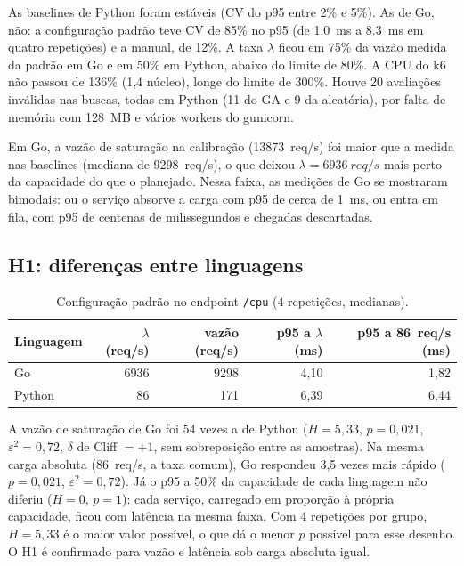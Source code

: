 \documentclass[11pt,a4paper]{article}
\begin{document}
As baselines de Python foram estáveis (CV do p95 entre 2\% e 5\%). As de Go, não: a configuração padrão teve CV de
85\% no p95 (de \SI{1,0}{ms} a \SI{8,3}{ms} em quatro repetições) e a manual, de 12\%. A taxa $\lambda$ ficou em 75\% da
vazão medida da padrão em Go e em 50\% em Python, abaixo do limite de 80\%. A CPU do k6 não passou de 136\% (1,4 núcleo),
longe do limite de 300\%. Houve 20 avaliações inválidas nas buscas, todas em Python (11 do GA e 9 da aleatória), por falta
de memória com \SI{128}{MB} e vários workers do gunicorn.

Em Go, a vazão de saturação na calibração (\SI{13873}{req/s}) foi maior que a medida nas baselines (mediana de
\SI{9298}{req/s}), o que deixou $\lambda = \SI{6936}{req/s}$ mais perto da capacidade do que o planejado. Nessa
faixa, as medições de Go se mostraram bimodais: ou o serviço absorve a carga com p95 de cerca de \SI{1}{ms}, ou
entra em fila, com p95 de centenas de milissegundos e chegadas descartadas.

\subsection{H1: diferenças entre linguagens}

\begin{table}[ht]
\centering
\caption{Configuração padrão no endpoint \texttt{/cpu} (4 repetições, medianas).}
\label{tab:h1}
\begin{tabular}{lrrrr}
\toprule
Linguagem & $\lambda$ (req/s) & vazão (req/s) & p95 a $\lambda$ (ms) & p95 a \SI{86}{req/s} (ms) \\
\midrule
Go     & 6936 & 9298 & 4,10 & 1,82 \\
Python & 86   & 171  & 6,39 & 6,44 \\
\bottomrule
\end{tabular}
\end{table}

A vazão de saturação de Go foi 54 vezes a de Python ($H = 5{,}33$, $p = 0{,}021$, $\varepsilon^2 = 0{,}72$, $\delta$ de
Cliff $= +1$, sem sobreposição entre as amostras). Na mesma carga absoluta (\SI{86}{req/s}, a taxa comum), Go respondeu
3,5 vezes mais rápido ($p = 0{,}021$, $\varepsilon^2 = 0{,}72$). Já o p95 a 50\% da capacidade de cada linguagem não
diferiu ($H = 0$, $p = 1$): cada serviço, carregado em proporção à própria capacidade, ficou com latência na mesma faixa.
Com 4 repetições por grupo, $H = 5{,}33$ é o maior valor possível, o que dá o menor $p$ possível para esse desenho.
O H1 é confirmado para vazão e latência sob carga absoluta igual.
\end{document}
